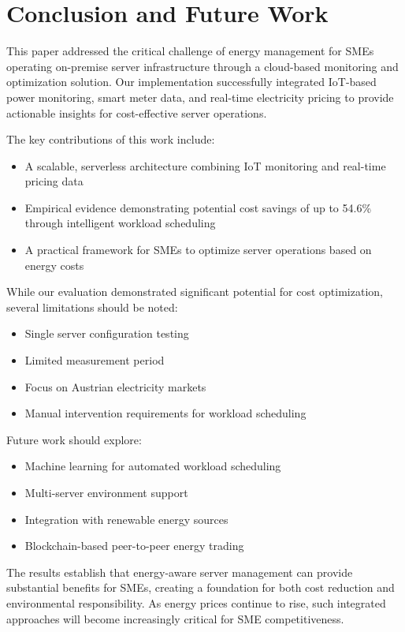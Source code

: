


\section{Conclusion and Future Work}
This paper addressed the critical challenge of energy management for SMEs operating on-premise server infrastructure through a cloud-based monitoring and optimization solution. Our implementation successfully integrated IoT-based power monitoring, smart meter data, and real-time electricity pricing to provide actionable insights for cost-effective server operations.

The key contributions of this work include:
\begin{itemize}
    \item A scalable, serverless architecture combining IoT monitoring and real-time pricing data
    \item Empirical evidence demonstrating potential cost savings of up to 54.6\% through intelligent workload scheduling
    \item A practical framework for SMEs to optimize server operations based on energy costs
\end{itemize}

While our evaluation demonstrated significant potential for cost optimization, several limitations should be noted:
\begin{itemize}
    \item Single server configuration testing
    \item Limited measurement period
    \item Focus on Austrian electricity markets
    \item Manual intervention requirements for workload scheduling
\end{itemize}

Future work should explore:
\begin{itemize}
    \item Machine learning for automated workload scheduling
    \item Multi-server environment support
    \item Integration with renewable energy sources
    \item Blockchain-based peer-to-peer energy trading
\end{itemize}

The results establish that energy-aware server management can provide substantial benefits for SMEs, creating a foundation for both cost reduction and environmental responsibility. As energy prices continue to rise, such integrated approaches will become increasingly critical for SME competitiveness.
